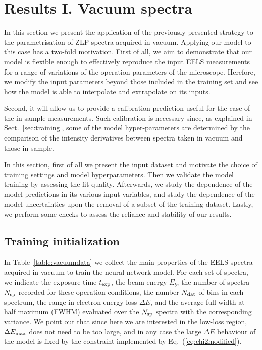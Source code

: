 \section{Results I. Vacuum spectra}
\label{sec:results_vacuum}

In this section we present the application of the previously presented strategy 
to the parametrisation of ZLP spectra acquired in vacuum.
%
Applying our model to this case has a two-fold motivation.
%
First of all, we aim to demonstrate that our model is flexible enough to effectively reproduce the
input EELS measurements for a range of variations of the operation parameters of the microscope.
%
Herefore, we modify the input parameters beyond those included in the training set
and see how the model is able to interpolate and extrapolate on its inputs.

Second, it will allow us to provide a calibration prediction
useful for the case of the in-sample measurements.
%
Such calibration is necessary since, as explained in Sect.~\ref{sec:training}, some of the model
hyper-parameters are determined by the comparison of the intensity derivatives
between spectra taken in vacuum and those in sample.

In this section, first of all we present the input dataset and motivate the choice
of training settings and model hyperparameters.
%
Then we validate the model training by assessing the fit quality.
%
Afterwards, we study the dependence of the model predictions in its various input
variables, and study the dependence of the model uncertainties upon
the removal of a subset of the training dataset.
%
Lastly, we perform some checks to assess the reliance and stability of our results.

\subsection{Training initialization}

In Table~\ref{table:vacuumdata} we collect the main properties of the EELS spectra acquired in vacuum to train the neural
    network model.  For each set of spectra, we indicate the exposure time $t_{\rm exp}$, the beam energy
    $E_b$, the number of spectra $N_{\rm sp}$ recorded for these operation conditions, the number $N_{\rm dat}$ of
    bins in each spectrum, the range in electron energy loss $\Delta E$,
    and the average full width at half maximum (FWHM)
    evaluated over the $N_{\rm sp}$ spectra with the corresponding variance.
    We point out that since here
    we are interested in the low-loss region, $\Delta E_{\rm max}$ does not need
    to be too large, and in any case the large $\Delta E$ behaviour of the model is fixed
    by the constraint implemented by Eq.~(\ref{eq:chi2modified}).

